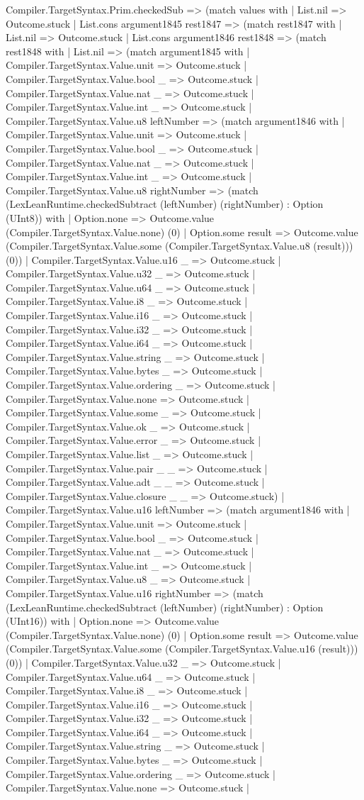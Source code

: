 \documentclass[11pt]{article}
\begin{document}
Compiler.TargetSyntax.Prim.checkedSub => (match values with | List.nil => Outcome.stuck | List.cons argument1845 rest1847 => (match rest1847 with | List.nil => Outcome.stuck | List.cons argument1846 rest1848 => (match rest1848 with | List.nil => (match argument1845 with | Compiler.TargetSyntax.Value.unit => Outcome.stuck | Compiler.TargetSyntax.Value.bool \_ => Outcome.stuck | Compiler.TargetSyntax.Value.nat \_ => Outcome.stuck | Compiler.TargetSyntax.Value.int \_ => Outcome.stuck | Compiler.TargetSyntax.Value.u8 leftNumber => (match argument1846 with | Compiler.TargetSyntax.Value.unit => Outcome.stuck | Compiler.TargetSyntax.Value.bool \_ => Outcome.stuck | Compiler.TargetSyntax.Value.nat \_ => Outcome.stuck | Compiler.TargetSyntax.Value.int \_ => Outcome.stuck | Compiler.TargetSyntax.Value.u8 rightNumber => (match (LexLeanRuntime.checkedSubtract (leftNumber) (rightNumber) : Option (UInt8)) with | Option.none => Outcome.value (Compiler.TargetSyntax.Value.none) (0) | Option.some result => Outcome.value (Compiler.TargetSyntax.Value.some (Compiler.TargetSyntax.Value.u8 (result))) (0)) | Compiler.TargetSyntax.Value.u16 \_ => Outcome.stuck | Compiler.TargetSyntax.Value.u32 \_ => Outcome.stuck | Compiler.TargetSyntax.Value.u64 \_ => Outcome.stuck | Compiler.TargetSyntax.Value.i8 \_ => Outcome.stuck | Compiler.TargetSyntax.Value.i16 \_ => Outcome.stuck | Compiler.TargetSyntax.Value.i32 \_ => Outcome.stuck | Compiler.TargetSyntax.Value.i64 \_ => Outcome.stuck | Compiler.TargetSyntax.Value.string \_ => Outcome.stuck | Compiler.TargetSyntax.Value.bytes \_ => Outcome.stuck | Compiler.TargetSyntax.Value.ordering \_ => Outcome.stuck | Compiler.TargetSyntax.Value.none => Outcome.stuck | Compiler.TargetSyntax.Value.some \_ => Outcome.stuck | Compiler.TargetSyntax.Value.ok \_ => Outcome.stuck | Compiler.TargetSyntax.Value.error \_ => Outcome.stuck | Compiler.TargetSyntax.Value.list \_ => Outcome.stuck | Compiler.TargetSyntax.Value.pair \_ \_ => Outcome.stuck | Compiler.TargetSyntax.Value.adt \_ \_ => Outcome.stuck | Compiler.TargetSyntax.Value.closure \_ \_ => Outcome.stuck) | Compiler.TargetSyntax.Value.u16 leftNumber => (match argument1846 with | Compiler.TargetSyntax.Value.unit => Outcome.stuck | Compiler.TargetSyntax.Value.bool \_ => Outcome.stuck | Compiler.TargetSyntax.Value.nat \_ => Outcome.stuck | Compiler.TargetSyntax.Value.int \_ => Outcome.stuck | Compiler.TargetSyntax.Value.u8 \_ => Outcome.stuck | Compiler.TargetSyntax.Value.u16 rightNumber => (match (LexLeanRuntime.checkedSubtract (leftNumber) (rightNumber) : Option (UInt16)) with | Option.none => Outcome.value (Compiler.TargetSyntax.Value.none) (0) | Option.some result => Outcome.value (Compiler.TargetSyntax.Value.some (Compiler.TargetSyntax.Value.u16 (result))) (0)) | Compiler.TargetSyntax.Value.u32 \_ => Outcome.stuck | Compiler.TargetSyntax.Value.u64 \_ => Outcome.stuck | Compiler.TargetSyntax.Value.i8 \_ => Outcome.stuck | Compiler.TargetSyntax.Value.i16 \_ => Outcome.stuck | Compiler.TargetSyntax.Value.i32 \_ => Outcome.stuck | Compiler.TargetSyntax.Value.i64 \_ => Outcome.stuck | Compiler.TargetSyntax.Value.string \_ => Outcome.stuck | Compiler.TargetSyntax.Value.bytes \_ => Outcome.stuck | Compiler.TargetSyntax.Value.ordering \_ => Outcome.stuck | Compiler.TargetSyntax.Value.none => Outcome.stuck | 
\end{document}
